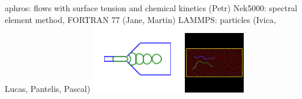 \documentclass[aspectratio=169,8pt]{beamer}
\begin{document}
aphros: flows with surface tension and chemical kinetics (Petr)
\newline
Nek5000: spectral element method, FORTRAN 77 (Jane, Martin)
\newline
LAMMPS: particles (Ivica, Lucas, Pantelis, Pascal)
\newline
\includegraphics[width=0.3\textwidth]{i/aphros.png}
\includegraphics[width=0.2\textwidth]{i/lammps.png}
\eframe

%
%
%
%
%
\end{document}
